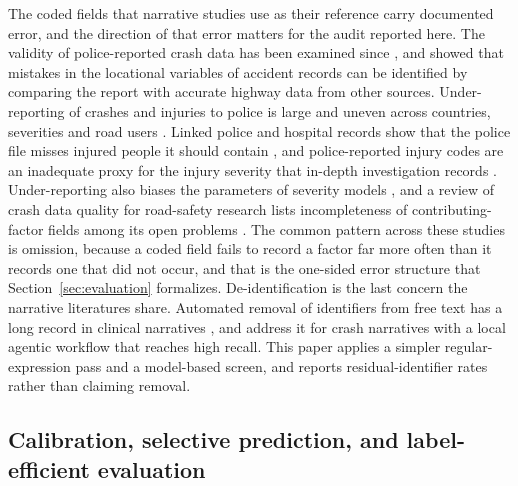 The coded fields that narrative studies use as their reference carry documented error, and
the direction of that error matters for the audit reported here. The validity of police-reported crash data has been examined since \citet{shinar1983validity}, and \citet{austin1995mistakes} showed that mistakes in the locational variables of accident records can be identified by comparing the report with accurate highway data from other sources. Under-reporting of crashes and injuries to police is large and uneven across countries, severities and road users \citep{elvik1999incomplete,alsop2001underreporting,amoros2006underreporting}. Linked police and hospital records show that the police file misses injured people it should contain \citep{watson2015underreporting,janstrup2016underreporting}, and police-reported injury codes are an inadequate proxy for the injury severity that in-depth investigation records \citep{farmer2003reliability}. Under-reporting also biases the parameters of severity
models \citep{yamamoto2008underreporting,ye2011underreporting}, and a review of crash data
quality for road-safety research lists incompleteness of contributing-factor fields among
its open problems \citep{imprialou2019quality}. The common pattern across these studies is omission, because a coded field fails to record a
factor far more often than it records one that did not occur, and that is the one-sided error
structure that Section~\ref{sec:evaluation} formalizes. De-identification is the last concern
the narrative literatures share. Automated removal of identifiers from free text has a long record in
clinical narratives \citep{uzuner2007deid,neamatullah2008deid,meystre2010deid,stubbs2015i2b2},
and \citet{ma2026pii} address it for crash narratives with a local agentic workflow that
reaches high recall. This paper applies a simpler regular-expression pass and a model-based
screen, and reports residual-identifier rates rather than claiming removal.

\subsection{Calibration, selective prediction, and label-efficient evaluation}
\label{sec:bg-calibration}

